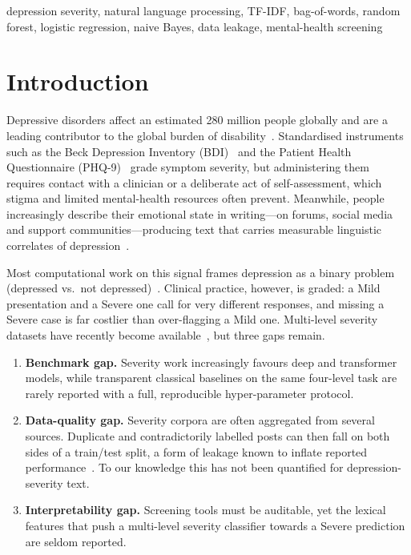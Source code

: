 \documentclass[conference]{IEEEtran}
\begin{document}
\begin{IEEEkeywords}
depression severity, natural language processing, TF-IDF, bag-of-words, random forest, logistic regression, naive Bayes, data leakage, mental-health screening
\end{IEEEkeywords}

\section{Introduction}

Depressive disorders affect an estimated 280 million people globally and are a leading contributor to the global burden of disability~\cite{who2023depression}. Standardised instruments such as the Beck Depression Inventory (BDI)~\cite{beck1996bdi2,beck1988psychometric} and the Patient Health Questionnaire (PHQ-9)~\cite{kroenke2001phq9} grade symptom severity, but administering them requires contact with a clinician or a deliberate act of self-assessment, which stigma and limited mental-health resources often prevent. Meanwhile, people increasingly describe their emotional state in writing---on forums, social media and support communities---producing text that carries measurable linguistic correlates of depression~\cite{rude2004language,dechoudhury2013predicting}.

Most computational work on this signal frames depression as a binary problem (depressed vs.\ not depressed)~\cite{dechoudhury2013predicting,coppersmith2014quantifying}. Clinical practice, however, is graded: a Mild presentation and a Severe one call for very different responses, and missing a Severe case is far costlier than over-flagging a Mild one. Multi-level severity datasets have recently become available~\cite{naseem2022early,sampath2022dataset}, but three gaps remain.

\begin{enumerate}
  \item \textbf{Benchmark gap.} Severity work increasingly favours deep and transformer models, while transparent classical baselines on the same four-level task are rarely reported with a full, reproducible hyper-parameter protocol.
  \item \textbf{Data-quality gap.} Severity corpora are often aggregated from several sources. Duplicate and contradictorily labelled posts can then fall on both sides of a train/test split, a form of leakage known to inflate reported performance~\cite{kapoor2023leakage,lee2022dedup}. To our knowledge this has not been quantified for depression-severity text.
  \item \textbf{Interpretability gap.} Screening tools must be auditable, yet the lexical features that push a multi-level severity classifier towards a Severe prediction are seldom reported.
\end{enumerate}
\end{document}
